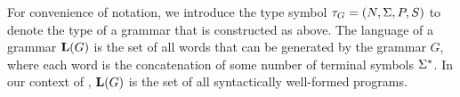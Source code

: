 For convenience of notation, we introduce the type symbol $\tau_{G} = (N,\Sigma,P,S)$ to denote the type of a grammar that is constructed as above.
The language of a grammar $\mathbf{L}(G)$ is the set of all words that can be generated by the grammar $G$, where each word is the concatenation of some number of terminal symbols $\Sigma^{*}$.
In our context of \approximatePBE, $\mathbf{L}(G)$ is the set of all syntactically well-formed programs.



